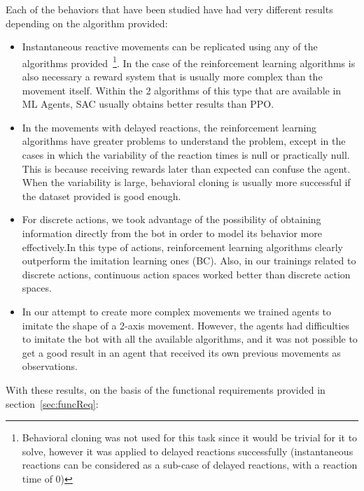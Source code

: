 Each of the behaviors that have been studied have had very different results depending on the algorithm provided:
\begin{itemize}
	\item Instantaneous reactive movements can be replicated using any of the algorithms provided~\footnote{Behavioral cloning was not used for this task since it would be trivial for it to solve, however it was applied to delayed reactions successfully (instantaneous reactions can be considered as a sub-case of delayed reactions, with a reaction time of 0)}. In the case of the reinforcement learning algorithms is also necessary a reward system that is usually more complex than the movement itself. Within the 2 algorithms of this type that are available in ML Agents, SAC usually obtains better results than PPO.
	\item In the movements with delayed reactions, the reinforcement learning algorithms have greater problems to understand the problem, except in the cases in which the variability of the reaction times is null or practically null. This is because receiving rewards later than expected can confuse the agent. When the variability is large, behavioral cloning is usually more successful if the dataset provided is good enough.
	\item For discrete actions, we took advantage of the possibility of obtaining information directly from the bot in order to model its behavior more effectively.In this type of actions, reinforcement learning algorithms clearly outperform the imitation learning ones (BC). Also, in our trainings related to discrete actions, continuous action spaces worked better than discrete action spaces.
	\item In our attempt to create more complex movements we trained agents to imitate the shape of a 2-axis movement. However, the agents had difficulties to imitate the bot with all the available algorithms, and it was not possible to get a good result in an agent that received its own previous movements as observations.
\end{itemize}

With these results, on the basis of the functional requirements provided in section~\ref{sec:funcReq}:


